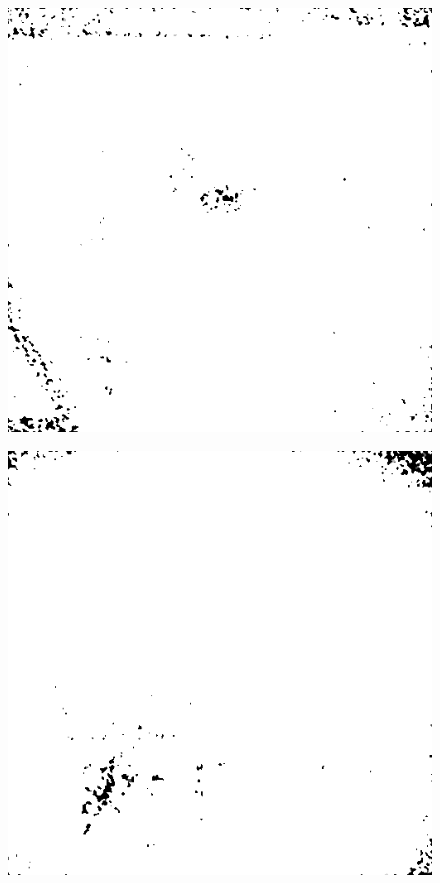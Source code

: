\begin{figure}[H]
    \centering
\begin{minipage}[t]{0.245\textwidth}
    \includegraphics[width=1\textwidth]{result/SPC_NRQA/b20_512_m30.PNG}
    \subcaption{}
    \label{fig:bad1}
\end{minipage}
\begin{minipage}[t]{0.245\textwidth}
    \includegraphics[width = \textwidth]{result/SPC_NRQA/b46_512_m30.PNG}

\end{minipage}
\end{figure}
